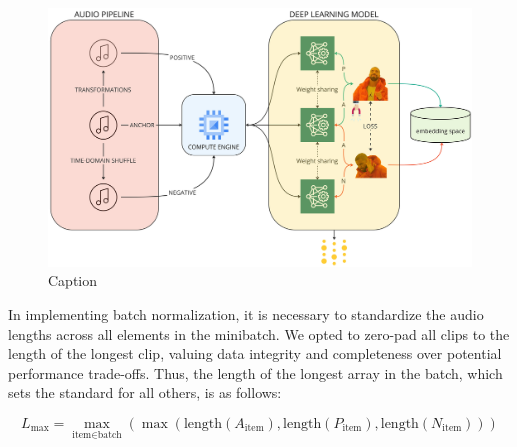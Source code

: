 \begin{figure}
    \centering
    \includegraphics[clip,width=\columnwidth]{figures/images/Triplet Network.jpeg}
    \caption[]{Caption}
    \label{fig:my_label}
\end{figure}




In implementing batch normalization, it is necessary to standardize the audio lengths across all elements in the minibatch. We opted to zero-pad all clips to the length of the longest clip, valuing data integrity and completeness over potential performance trade-offs. Thus, the length of the longest array in the batch, which sets the standard for all others, is as follows:

\begin{equation}
L_{\text{max}} = \max_{\text{item} \in \text{batch}}(\max(\text{length}(A_{\text{item}}), \text{length}(P_{\text{item}}), \text{length}(N_{\text{item}})))
\end{equation}
\newpage